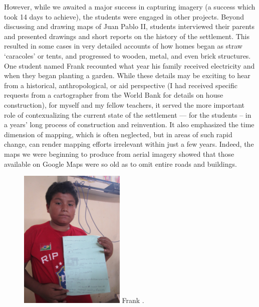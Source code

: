 \documentclass[11pt]{report}
\begin{document}
However, while we awaited a major success in capturing imagery (a success which took 14 days to achieve), the students were engaged in other projects. Beyond discussing and drawing maps of Juan Pablo II, students interviewed their parents and presented drawings and short reports on the history of the settlement. This resulted in some cases in very detailed accounts of how homes began as straw `caracoles' or tents, and progressed to wooden, metal, and even brick structures. One student named Frank recounted what year his family received electricity and when they began planting a garden. While these details may be exciting to hear from a historical, anthropological, or aid perspective (I had received specific requests from a cartographer from the World Bank for details on house construction), for myself and my fellow teachers, it served the more important role of contexualizing the current state of the settlement --- for the students -- in a years' long process of construction and reinvention. It also emphasized the time dimension of mapping, which is often neglected, but in areas of such rapid change, can render mapping efforts irrelevant within just a few years. Indeed, the maps we were beginning to produce from aerial imagery showed that those available on Google Maps were so old as to omit entire roads and buildings.

\begin{figure}
	\begin{flushright}
		\includegraphics[width=0.45\textwidth]{images/juan-pablo-frank.jpg}
		Frank .
	\end{flushright}
\end{figure}
\end{document}
